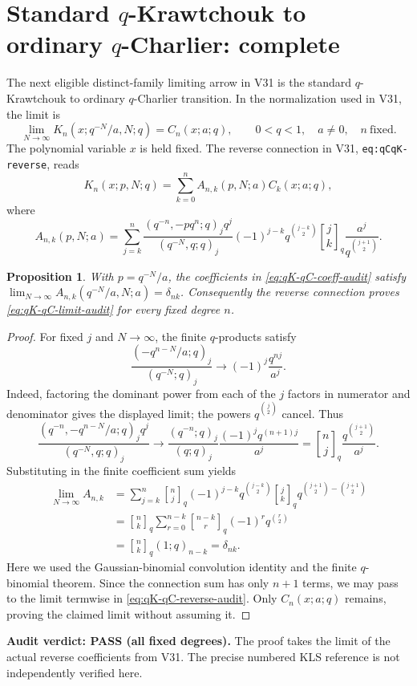 \documentclass[11pt]{article}
\newtheorem{proposition}{Proposition}
\begin{document}
\section{Standard $q$-Krawtchouk to ordinary $q$-Charlier: complete}
The next eligible distinct-family limiting arrow in V31 is the standard
$q$-Krawtchouk to ordinary $q$-Charlier transition.  In the normalization
used in V31, the limit is
\begin{equation}\label{eq:qK-qC-limit-audit}
\lim_{N\to\infty}K_n(x;q^{-N}/a,N;q)=C_n(x;a;q),
\qquad 0<q<1,\quad a\ne0,\quad n\ \text{fixed}.
\end{equation}
The polynomial variable $x$ is held fixed. The reverse connection in V31,
\texttt{eq:qCqK-reverse}, reads
\begin{equation}\label{eq:qK-qC-reverse-audit}
K_n(x;p,N;q)=\sum_{k=0}^n A_{n,k}(p,N;a)C_k(x;a;q),
\end{equation}
where
\begin{equation}\label{eq:qK-qC-coeff-audit}
A_{n,k}(p,N;a)=\sum_{j=k}^n
\frac{(q^{-n},-pq^n;q)_j q^j}{(q^{-N},q;q)_j}
(-1)^{j-k}q^{\binom{j-k}{2}}
{j\brack k}_q\frac{a^j}{q^{\binom{j+1}{2}}}.
\end{equation}
\begin{proposition}
With $p=q^{-N}/a$, the coefficients in
\eqref{eq:qK-qC-coeff-audit} satisfy
$\lim_{N\to\infty}A_{n,k}(q^{-N}/a,N;a)=\delta_{nk}$.
Consequently the reverse connection proves \eqref{eq:qK-qC-limit-audit}
for every fixed degree $n$.
\end{proposition}
\begin{proof}
For fixed $j$ and $N\to\infty$, the finite $q$-products satisfy
\[
\frac{(-q^{n-N}/a;q)_j}{(q^{-N};q)_j}
\longrightarrow (-1)^j\frac{q^{nj}}{a^j}.
\]
Indeed, factoring the dominant power from each of the $j$ factors in
numerator and denominator gives the displayed limit; the powers
$q^{\binom j2}$ cancel. Thus
\[
\frac{(q^{-n},-q^{n-N}/a;q)_j q^j}{(q^{-N},q;q)_j}
\longrightarrow
\frac{(q^{-n};q)_j}{(q;q)_j}
\frac{(-1)^jq^{(n+1)j}}{a^j}
={n\brack j}_q\frac{q^{\binom{j+1}{2}}}{a^j}.
\]
Substituting in the finite coefficient sum yields
\[
\begin{aligned}
\lim_{N\to\infty}A_{n,k}
&=\sum_{j=k}^n {n\brack j}_q
(-1)^{j-k}q^{\binom{j-k}{2}}{j\brack k}_q
q^{\binom{j+1}{2}-\binom{j+1}{2}}\\
&={n\brack k}_q\sum_{r=0}^{n-k}
{n-k\brack r}_q(-1)^rq^{\binom r2}\\
&={n\brack k}_q(1;q)_{n-k}=\delta_{nk}.
\end{aligned}
\]
Here we used the Gaussian-binomial convolution identity and the finite
$q$-binomial theorem. Since the connection sum has only $n+1$ terms,
we may pass to the limit termwise in \eqref{eq:qK-qC-reverse-audit}.
Only $C_n(x;a;q)$ remains, proving the claimed limit without assuming it.
\end{proof}
\noindent\textbf{Audit verdict: PASS (all fixed degrees).}
The proof takes the limit of the actual reverse coefficients from V31.
The precise numbered KLS reference is not independently verified here.
\end{document}
